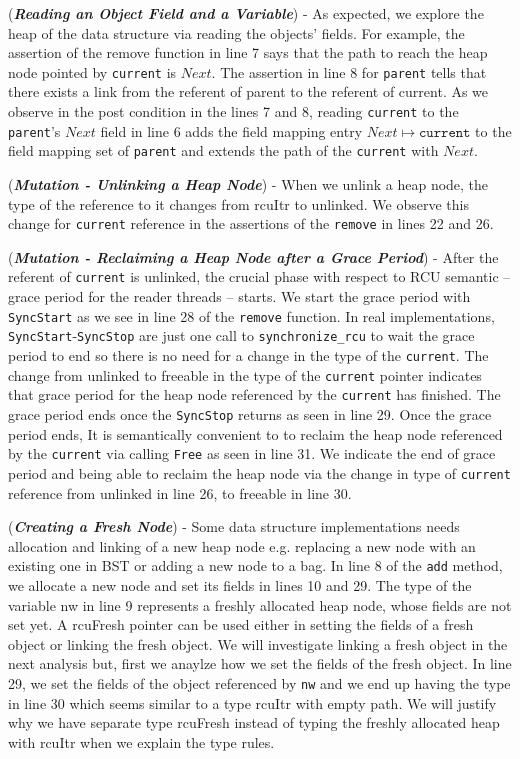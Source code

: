 (\textit{\textbf{Reading an Object Field and a Variable}}) - As expected, we explore the heap of the data structure via reading the objects' fields. For example, the assertion of the \textsf{remove} function in line 7 says that the path to reach the heap node pointed by \texttt{current} is $Next$. The assertion in line 8 for \texttt{parent} tells that there exists a link from the referent of \textsf{parent} to the referent of \textsf{current}. As we observe in the post condition in the lines 7 and 8, reading \texttt{current} to the \texttt{parent}'s $Next$ field in line 6 adds the field mapping entry $Next \mapsto \texttt{current}$ to the field mapping set of \texttt{parent} and extends the path of the \texttt{current} with $Next$.

(\textit{\textbf{Mutation - Unlinking a Heap Node}}) - When we unlink a heap node, the type of the reference to it changes from \textsf{rcuItr} to \textsf{unlinked}. We observe this change for \texttt{current} reference in the assertions of the \texttt{remove} in lines 22 and 26.

(\textit{\textbf{Mutation - Reclaiming a Heap Node after a Grace Period}}) - After the referent of \texttt{current} is unlinked, the crucial phase with respect to \textsf{RCU} semantic -- grace period for the reader threads -- starts. We start the grace period with \texttt{SyncStart} as we see in line 28 of the \texttt{remove} function. In real implementations, \texttt{SyncStart}-\texttt{SyncStop} are just one call to \texttt{synchronize\_rcu} to wait the grace period to end so there is no need for a change in the type of the \texttt{current}. The change from \textsf{unlinked} to \textsf{freeable} in the type of the \texttt{current} pointer indicates that grace period for the heap node referenced by the \texttt{current} has finished. The grace period ends once the \texttt{SyncStop} returns as seen in line 29. Once the grace period ends, It is semantically convenient to to reclaim the heap node referenced by the \texttt{current} via calling \texttt{Free} as seen in line 31. We indicate the end of grace period and being able to reclaim the heap node via the change in type of \texttt{current} reference from \textsf{unlinked} in line 26, to \textsf{freeable} in line 30.

(\textit{\textbf{Creating a Fresh Node}}) - Some data structure implementations needs allocation and linking of a new heap node e.g. replacing a new node with an existing one in BST or adding a new node to a bag. In line 8 of the \texttt{add} method, we allocate a new node and set its fields in lines 10 and 29. The type of the variable \textsf{nw} in line 9 represents a freshly allocated heap node, whose fields are not set yet. A \textsf{rcuFresh} pointer can be used either in setting the fields of a fresh object or linking the fresh object. We will investigate  linking a fresh object in the next analysis but, first we anaylze how we set the fields of the fresh object. In  line 29, we set the fields of the object referenced by \texttt{nw} and we end up having the type in line 30 which seems similar to a type \textsf{rcuItr} with empty path. We will justify why we have separate type \textsf{rcuFresh} instead of typing the freshly allocated heap with \textsf{rcuItr} when we explain the type rules.
